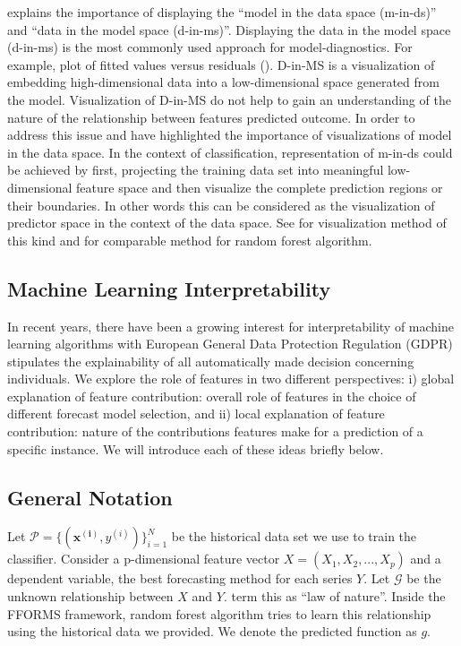 \documentclass[11pt,a4paper,]{article}
\begin{document}
\textcite{wickham2015visualizing} explains the importance of displaying
the ``model in the data space (m-in-ds)'' and ``data in the model space
(d-in-ms)''. Displaying the data in the model space (d-in-ms) is the
most commonly used approach for model-diagnostics. For example, plot of
fitted values versus residuals (\textcite{wickham2015visualizing}).
D-in-MS is a visualization of embedding high-dimensional data into a
low-dimensional space generated from the model. Visualization of D-in-MS
do not help to gain an understanding of the nature of the relationship
between features predicted outcome. In order to address this issue
\textcite{wickham2015visualizing} and \textcite{da2017interactive} have
highlighted the importance of visualizations of model in the data space.
In the context of classification, representation of m-in-ds could be
achieved by first, projecting the training data set into meaningful
low-dimensional feature space and then visualize the complete prediction
regions or their boundaries. In other words this can be considered as
the visualization of predictor space in the context of the data space.
See \textcite{wickham2015visualizing} for visualization method of this
kind and \textcite{da2017interactive} for comparable method for random
forest algorithm.

\subsection{Machine Learning
Interpretability}\label{machine-learning-interpretability}

In recent years, there have been a growing interest for interpretability
of machine learning algorithms with European General Data Protection
Regulation (GDPR) stipulates the explainability of all automatically
made decision concerning individuals. We explore the role of features in
two different perspectives: i) global explanation of feature
contribution: overall role of features in the choice of different
forecast model selection, and ii) local explanation of feature
contribution: nature of the contributions features make for a prediction
of a specific instance. We will introduce each of these ideas briefly
below.

\subsection{General Notation}\label{general-notation}

Let \(\mathcal{P}=\{(\mathbf{x^{(i)}}, y^{(i)})\}_{i=1}^{N}\) be the
historical data set we use to train the classifier. Consider a
p-dimensional feature vector \(X=(X_1, X_2, ..., X_p)\) and a dependent
variable, the best forecasting method for each series \(Y\). Let
\(\mathcal{G}\) be the unknown relationship between \(X\) and \(Y\).
\textcite{Zhao} term this as ``law of nature''. Inside the FFORMS
framework, random forest algorithm tries to learn this relationship
using the historical data we provided. We denote the predicted function
as \(g\).
\end{document}
